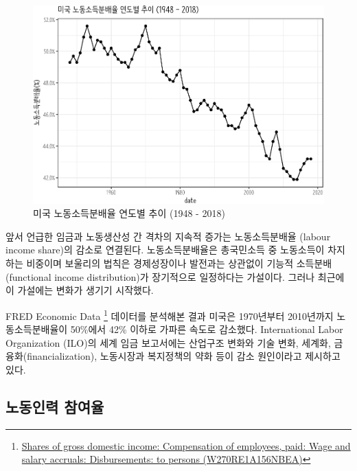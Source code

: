 \documentclass[smallextended]{svjour3}       %
\begin{document}
\begin{figure}

{\centering \includegraphics[width=1\linewidth]{paper_files/figure-latex/labor-share-us-1} 

}

\caption{미국 노동소득분배율 연도별 추이 (1948 - 2018)}\label{fig:labor-share-us}
\end{figure}

앞서 언급한 임금과 노동생산성 간 격차의 지속적 증가는 노동소득분배율
(labour income share)의 감소로 연결된다. 노동소득분배율은 총국민소득 중
노동소득이 차지하는 비중이며 보울리의 법칙은 경제성장이나 발전과는
상관없이 기능적 소득분배(functional income distribution)가 장기적으로
일정하다는 가설\cite{lee_2014}이다. 그러나 최근에 이 가설에는 변화가
생기기 시작했다.

FRED Economic Data \footnote{\href{https://fred.stlouisfed.org/series/W270RE1A156NBEA}{Shares
  of gross domestic income: Compensation of employees, paid: Wage and
  salary accruals: Disbursements: to persons (W270RE1A156NBEA)}}
데이터를 분석해본 결과 미국은 1970년부터 2010년까지 노동소득분배율이
50\%에서 42\% 이하로 가파른 속도로 감소했다. International Labor
Organization (ILO)의 세계 임금 보고서\cite{ilo2015labour}에는 산업구조
변화와 기술 변화, 세계화, 금융화(financialization), 노동시장과
복지정책의 약화 등이 감소 원인이라고 제시하고 있다.

\hypertarget{labor-participation}{%
\subsection{노동인력 참여율}\label{labor-participation}}
\end{document}
